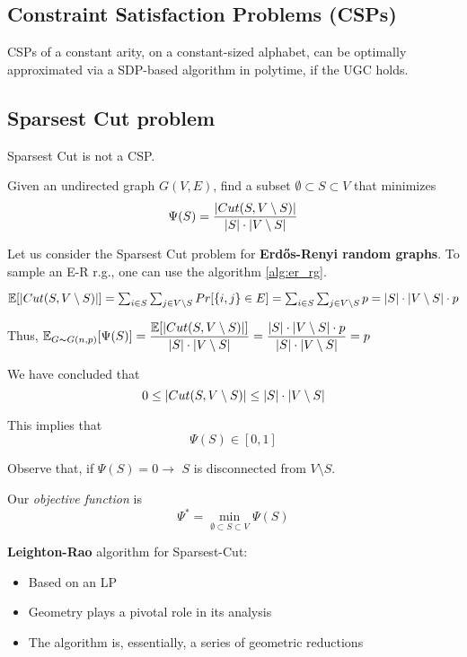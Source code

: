 \subsection{Constraint Satisfaction Problems (CSPs)}
    CSPs of a constant arity, on a constant-sized alphabet, can be optimally approximated via a SDP-based algorithm in polytime, if the UGC holds.


\subsection{Sparsest Cut problem}
    Sparsest Cut is not a CSP.\@

    Given an undirected graph $G(V,E)$, find a subset $\emptyset \subset S \subset V$ that minimizes
    \[ \Psi(S) = \dfrac{\vert Cut(S, V \setminus S) \vert}{\vert S \vert \cdot \vert V \setminus S \vert} \]

    Let us consider the Sparsest Cut problem for \textbf{Erd\H{o}s-Renyi random graphs}.
    To sample an E-R r.g., one can use the algorithm \ref{alg:er_rg}.

    

    $\mathbb{E}[\vert Cut(S, V \setminus S) \vert] =
    \sum_{i \in S} \sum_{j \in V \setminus S} Pr[\{ i,j \} \in E] =
    \sum_{i \in S} \sum_{j \in V \setminus S} p =
    \vert S \vert \cdot \vert V \setminus S \vert \cdot p$

    Thus, $\mathbb{E}_{G \thicksim G(n,p)}[\Psi(S)] =
    \dfrac{\mathbb{E}[\vert Cut(S, V \setminus S) \vert]}{\vert S \vert \cdot \vert V \setminus S \vert} =
    \dfrac{ \vert S \vert \cdot \vert V \setminus S \vert \cdot p}{\vert S \vert \cdot \vert V \setminus S \vert} = 
    p$

    We have concluded that
    \[ 0 \leq \vert Cut(S, V \setminus S) \vert \leq \vert S \vert \cdot \vert V \setminus S \vert \]

    This implies that
    \[ \Psi(S) \in [0,1] \]

    Observe that, if $\Psi(S) = 0 \rightarrow$ $S$ is disconnected from $V \setminus S$.

    Our \textit{objective function} is
    \[ \Psi^* = \min_{\emptyset \subset S \subset V} \Psi(S) \]

    \textbf{Leighton-Rao} algorithm for Sparsest-Cut:
    \begin{itemize}
        \item Based on an LP
        \item Geometry plays a pivotal role in its analysis
        \item The algorithm is, essentially, a series of geometric reductions
    \end{itemize}


